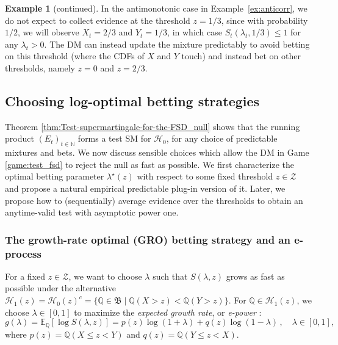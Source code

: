 \documentclass[12pt,twoside]{article}
\theoremstyle{plain}
\theoremstyle{definition}
\newtheorem{example}{Example}
\theoremstyle{remark}
\newcommand{\N}{\mathbb{N}}
\newcommand{\calH}{\mathcal{H}}
\newcommand{\calZ}{\mathcal{Z}}
\newcommand{\Esymb}{\mathbb{E}}
\newcommand{\Qsymb}{\mathbb{Q}}
\newcommand{\Ex}[2]{\Esymb_{{#1}}\left[{#2}\right]}
\newcommand{\frakB}{\mathfrak{B}}
\begin{document}
\addtocounter{example}{-1}
\begin{example}[continued]
In the antimonotonic case in Example~\ref{ex:anticorr}, we do not expect to collect evidence at the threshold $z=1/3$, since with probability $1/2$, we will observe $X_t=2/3$ and $Y_t=1/3$, in which case $S_t(\lambda_t, 1/3) \leq 1$ for any $\lambda_t>0$. 
The DM can instead update the mixture predictably to avoid betting on this threshold (where the CDFs of $X$ and $Y$ touch) and instead bet on other thresholds, namely $z=0$ and $z=2/3$.
\end{example}




\subsection{Choosing log-optimal betting strategies}

Theorem \ref{thm:Test-supermartingale-for-the-FSD_null} shows that the running product $(E_t)_{t\in \N}$ forms a test SM for $\calH_0$, for any choice of predictable mixtures and bets. 
We now discuss sensible choices which allow the DM in Game \ref{game:test_fsd} to reject the null as fast as possible. 
We first characterize the optimal betting parameter $\lambda^\star(z)$ with respect to some fixed threshold $z\in \calZ$ and propose a natural empirical predictable plug-in version of it. 
Later, we propose how to (sequentially) average evidence over the thresholds to obtain an anytime-valid test with asymptotic power one.

\subsubsection{The growth-rate optimal (GRO) betting strategy and an e-process}\label{subsec:GRO_fixed_threshold}

For a fixed $z \in \calZ$, we want to choose $\lambda$ such that $S(\lambda, z)$ grows as fast as possible under the alternative
$\calH_1(z) = \calH_0(z)^c
    = \{\Qsymb \in \frakB \mid \Qsymb(X>z) < \Qsymb(Y>z)\}.
$
For $\Qsymb \in \calH_1(z)$, we choose $\lambda\in [0,1]$ to maximize the \emph{expected growth rate}, or \emph{e-power} \citep{shafer2011test,grunwald2019safe,vovk2024nonparametric,larsson2025numeraire}:
\begin{equation}\label{eq:power_target_FSD}
g(\lambda) = \Ex{\mathbb{Q}}{\log S(\lambda, z)}= p(z)\log(1+\lambda) + q(z)\log(1-\lambda) \,, \quad \lambda\in [0,1],
\end{equation} 
where $p(z)=\Qsymb(X\leq z<Y)$ and $q(z)=\Qsymb(Y\leq z<X)$. 
\end{document}
